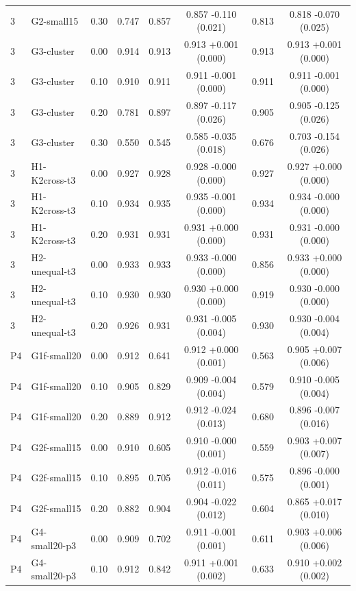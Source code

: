 {\begin{longtable}{llcccccc}
3 & G2-small15 & 0.30 & 0.747 & 0.857 & 0.857 -0.110 (0.021) & 0.813 & 0.818 -0.070 (0.025) \\
3 & G3-cluster & 0.00 & 0.914 & 0.913 & 0.913 +0.001 (0.000) & 0.913 & 0.913 +0.001 (0.000) \\
3 & G3-cluster & 0.10 & 0.910 & 0.911 & 0.911 -0.001 (0.000) & 0.911 & 0.911 -0.001 (0.000) \\
3 & G3-cluster & 0.20 & 0.781 & 0.897 & 0.897 -0.117 (0.026) & 0.905 & 0.905 -0.125 (0.026) \\
3 & G3-cluster & 0.30 & 0.550 & 0.545 & 0.585 -0.035 (0.018) & 0.676 & 0.703 -0.154 (0.026) \\
3 & H1-K2cross-t3 & 0.00 & 0.927 & 0.928 & 0.928 -0.000 (0.000) & 0.927 & 0.927 +0.000 (0.000) \\
3 & H1-K2cross-t3 & 0.10 & 0.934 & 0.935 & 0.935 -0.001 (0.000) & 0.934 & 0.934 -0.000 (0.000) \\
3 & H1-K2cross-t3 & 0.20 & 0.931 & 0.931 & 0.931 +0.000 (0.000) & 0.931 & 0.931 -0.000 (0.000) \\
3 & H2-unequal-t3 & 0.00 & 0.933 & 0.933 & 0.933 -0.000 (0.000) & 0.856 & 0.933 +0.000 (0.000) \\
3 & H2-unequal-t3 & 0.10 & 0.930 & 0.930 & 0.930 +0.000 (0.000) & 0.919 & 0.930 -0.000 (0.000) \\
3 & H2-unequal-t3 & 0.20 & 0.926 & 0.931 & 0.931 -0.005 (0.004) & 0.930 & 0.930 -0.004 (0.004) \\
P4 & G1f-small20 & 0.00 & 0.912 & 0.641 & 0.912 +0.000 (0.001) & 0.563 & 0.905 +0.007 (0.006) \\
P4 & G1f-small20 & 0.10 & 0.905 & 0.829 & 0.909 -0.004 (0.004) & 0.579 & 0.910 -0.005 (0.004) \\
P4 & G1f-small20 & 0.20 & 0.889 & 0.912 & 0.912 -0.024 (0.013) & 0.680 & 0.896 -0.007 (0.016) \\
P4 & G2f-small15 & 0.00 & 0.910 & 0.605 & 0.910 -0.000 (0.001) & 0.559 & 0.903 +0.007 (0.007) \\
P4 & G2f-small15 & 0.10 & 0.895 & 0.705 & 0.912 -0.016 (0.011) & 0.575 & 0.896 -0.000 (0.001) \\
P4 & G2f-small15 & 0.20 & 0.882 & 0.904 & 0.904 -0.022 (0.012) & 0.604 & 0.865 +0.017 (0.010) \\
P4 & G4-small20-p3 & 0.00 & 0.909 & 0.702 & 0.911 -0.001 (0.001) & 0.611 & 0.903 +0.006 (0.006) \\
P4 & G4-small20-p3 & 0.10 & 0.912 & 0.842 & 0.911 +0.001 (0.002) & 0.633 & 0.910 +0.002 (0.002) \\

\end{longtable}}
